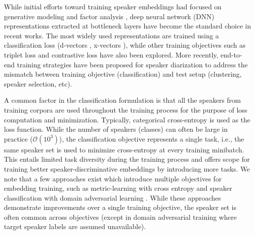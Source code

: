 While initial efforts toward training speaker embeddings had focused on generative modeling \cite{reynolds2000speaker,campbell_SVMGMM2006} and factor analysis \cite{dehak_ivectors2011}, deep neural network (DNN) representations extracted at bottleneck layers have become the standard choice in recent works. The most widely used representations are trained using a classification loss (d-vectors \cite{origdvec_variani2014deep}, x-vectors \cite{snyder_xvec2017, snyder_xvec2018}), while other training objectives such as triplet loss \cite{bredin_tristounet2017, zhang_triplet2018} and contrastive loss \cite{chung2018Voxceleb2} have also been explored.
More recently, end-to-end training strategies \cite{Fujita2019, horiguchi2020endtoend, fujita2020endtoend} have been proposed for speaker diarization to address the mismatch between training objective (classification) and test setup (clustering, speaker selection, etc).

A common factor in the classification formulation is that all the speakers from training corpora are used throughout the training process for the purpose of loss computation and minimization. Typically, categorical cross-entropy is used as the loss function.
While the number of speakers (classes) can often be large in practice ($\mathcal{O}(10^3)$), the classification objective represents a single task, i.e., the same speaker set is used to minimize cross-entropy at every training minibatch.
This entails limited task diversity during the training process and offers scope for training better speaker-discriminative embeddings by introducing more tasks.
We note that a few approaches exist which introduce multiple objectives for embedding training, such as metric-learning with cross entropy \cite{XU2020394, ren2019} and speaker classification with domain adversarial learning \cite{zhou2019dann, wang2018dann}. While these approaches demonstrate improvements over a single training objective, the speaker set is often common across objectives (except in domain adversarial training where target speaker labels are assumed unavailable).


